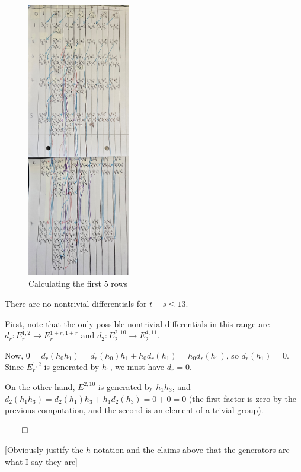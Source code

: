 \documentclass{MetricNotes2023}
\def\done{\begin{flushright}\vspace{-4.35ex}\(\qed\)\end{flushright}}
\begin{document}
\begin{figure}[H]
\centering
\includegraphics[width=0.4\textwidth]{ext3}
\caption{Calculating the first 5 rows}
\end{figure}

\begin{lemma}
There are no nontrivial differentials for \(t-s\leq 13\). 
\end{lemma}

\begin{ourproof}
First, note that the only possible nontrivial differentials in this range are \(d_r : E_r^{1,2} \to E_r^{1+r, 1+r}\) and \(d_2 : E_2^{2, 10} \to E_2^{4, 11}\). 

Now, \(0=d_r(h_0h_1)=d_r(h_0)h_1 + h_0d_r(h_1)=h_0d_r(h_1)\), so \(d_r(h_1)=0\). Since \(E_r^{1, 2}\) is generated by \(h_1\), we must have \(d_r=0\). 

On the other hand, \(E^{2, 10}\) is generated by \(h_1h_3\), and \(d_2(h_1h_3)=d_2(h_1)h_3+h_1d_2(h_3)=0+0=0\) (the first factor is zero by the previous computation, and the second is an element of a trivial group). \done
\end{ourproof}

[Obviously justify the \(h\) notation and the claims above that the generators are what I say they are]
\end{document}
